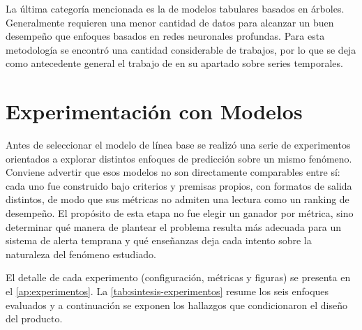 La última categoría mencionada es la de modelos tabulares basados en árboles. Generalmente requieren una menor cantidad de datos para alcanzar un buen desempeño que enfoques basados en redes neuronales profundas. Para esta metodología se encontró una cantidad considerable de trabajos, por lo que se deja como antecedente general el trabajo de \textcite{zheng2018} en su apartado sobre series temporales.


\section{Experimentación con Modelos}\label{experimentaciuxf3n-con-modelos}

Antes de seleccionar el modelo de línea base se realizó una serie de experimentos orientados a explorar distintos enfoques de predicción sobre un mismo fenómeno. Conviene advertir que esos modelos no son directamente comparables entre sí: cada uno fue construido bajo criterios y premisas propios, con formatos de salida distintos, de modo que sus métricas no admiten una lectura como un ranking de desempeño. El propósito de esta etapa no fue elegir un ganador por métrica, sino determinar qué manera de plantear el problema resulta más adecuada para un sistema de alerta temprana y qué enseñanzas deja cada intento sobre la naturaleza del fenómeno estudiado.

El detalle de cada experimento (configuración, métricas y figuras) se presenta en el \cref{ap:experimentos}. La \cref{tab:sintesis-experimentos} resume los seis enfoques evaluados y a continuación se exponen los hallazgos que condicionaron el diseño del producto.

